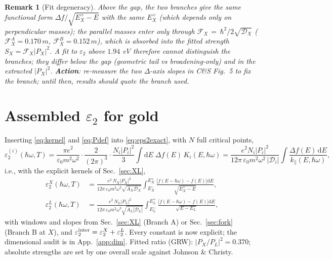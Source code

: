 \documentclass[11pt,a4paper]{article}
\numberwithin{equation}{section}
\newcommand{\hw}{\hbar\omega}
\newcommand{\cD}{\mathcal{D}}
\newcommand{\cF}{\mathcal{F}}
\newcommand{\Ab}{\bar{A}}
\newcommand{\kpar}{k_{\parallel}}
\newcommand{\eps}{\varepsilon}
\newcommand{\epsz}{\varepsilon_0}
\newcommand{\dd}{\mathrm{d}}
\newcommand{\fFD}{f}
\newtheorem{remark}{Remark}[section]
\begin{document}
\begin{remark}[Fit degeneracy]\label{rem:degeneracy}
Above the gap, the two branches give the \emph{same functional form}
$\Delta f/\sqrt{E^+_X-E}$ with the same $E^+_X$ (which depends only on
perpendicular masses); the parallel masses enter only through
$\cF_X\,{=}\,\hbar^2/2\sqrt{\cD_X}$
($\cF_X^{A}=0.170\,m$, $\cF_X^{B}=0.152\,m$), which is absorbed into
the fitted strength $S_X=\cF_X|P_X|^2$.  A fit to $\eps_2$ above
$1.94$ eV therefore \emph{cannot} distinguish the branches; they
differ below the gap (geometric tail vs broadening-only) and in the
extracted $|P_X|^2$.  \textbf{Action}: re-measure the two $\Delta$-axis
slopes in C\&S Fig.~5 to fix the branch; until then, results should
quote the branch used.
\end{remark}

\section{Assembled $\eps_2$ for gold}\label{sec:eps2}

Inserting \eqref{eq:kernel} and \eqref{eq:Pdef} into
\eqref{eq:eps2exact}, with $N$ full critical points,
\begin{equation}
\eps_2^{(i)}(\hw,T)
=\frac{\pi e^2}{\epsz m^2\omega^2}\cdot\frac{2}{(2\pi)^3}\cdot
\frac{N_i|P_i|^2}{3}\int\!\dd E\;\Delta f(E)\,K_i(E,\hw)
=\frac{e^2N_i|P_i|^2}{12\pi\,\epsz m^2\omega^2\,|\cD_i|}
\int\!\frac{\Delta f(E)\,\dd E}{\kpar(E,\hw)} ,
\end{equation}
i.e., with the explicit kernels of Sec.~\ref{sec:XL},
\begin{equation}
\boxed{\;
\begin{aligned}
\eps_2^{X}(\hw,T)&=\frac{e^2\,N_X|P_X|^2}
{12\pi\,\epsz m^2\omega^2\sqrt{\Ab_X\cD_X}}
\int_{E^-_X}^{E^+_X}
\frac{\bigl[\fFD(E-\hw)-\fFD(E)\bigr]\dd E}{\sqrt{E^+_X-E}},\\[6pt]
\eps_2^{L}(\hw,T)&=\frac{e^2\,N_L|P_L|^2}
{12\pi\,\epsz m^2\omega^2\sqrt{\Ab_L|\cD_L|}}
\int_{E^-_L}^{E^+_L}
\frac{\bigl[\fFD(E-\hw)-\fFD(E)\bigr]\dd E}{\sqrt{E-E^-_L}},
\end{aligned}\;}
\label{eq:eps2final}
\end{equation}
with windows and slopes from Sec.~\ref{sec:XL} (Branch A) or
Sec.~\ref{sec:fork} (Branch B at $X$), and
$\eps_2^{\rm inter}=\eps_2^X+\eps_2^L$.  Every constant is now
explicit; the dimensional audit is in App.~\ref{app:dim}.  Fitted
ratio (GRW): $|P_X/P_L|^2=0.370$; absolute strengths are set by one
overall scale against Johnson \& Christy.
\end{document}
